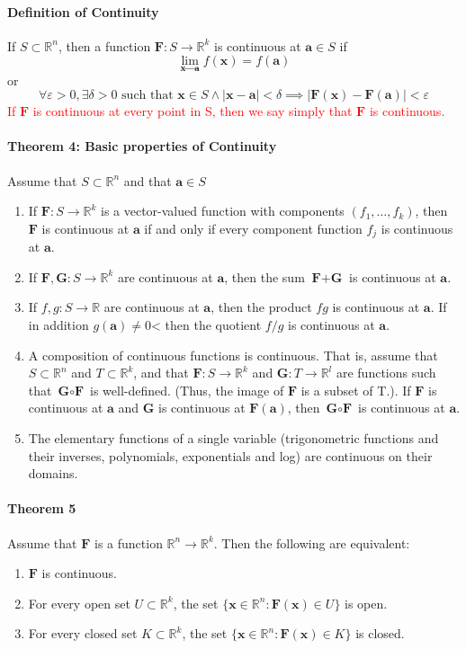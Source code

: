 \documentclass[11pt]{article}
\newcommand{\tb}[1]{\textbf{#1}}
\newcommand{\real}[0]{\mathbb{R}}
\newcommand{\vx}[0]{\tb{x}}
\newcommand{\va}[0]{\tb{a}}
\newcommand{\vf}[0]{\tb{F}}
\newcommand{\vg}[0]{\tb{G}}
\newcommand{\lima}{\underset{\vx \rightarrow \va}{\lim}}
\begin{document}
\paragraph{Definition of Continuity}
If $S \subset \real^n$, then a function $\vf: S \rightarrow \real^k$ is continuous at $\va \in S$ if 
$$ \lima f(\vx) = f(\va)$$ or
$$\forall \varepsilon > 0, \exists \delta > 0 \mbox{ such that } \vx \in S \wedge |\vx - \va| < \delta \implies |\vf(\vx) - \vf(\va)| < \varepsilon$$
\textcolor{red}{If $\vf$ is continuous at every point in S, then we say simply that $\vf$ is continuous.}
\paragraph{Theorem 4: Basic properties of Continuity} Assume that $S \subset \real^n$ and that $\va \in S$
\begin{enumerate}
	\item If $\vf: S \rightarrow \real^k$ is a vector-valued function with components $(f_1, \hdots, f_k)$, then $\vf$ is continuous at $\va$ if and only if every component function $f_j$ is continuous at $\va$.
	\item If $\vf, \vg: S \rightarrow \real^k$ are continuous at $\va$, then the sum $\vf + \vg$ is continuous at $\va$.
	\item If $f, g: S \rightarrow \real$ are continuous at $\va$, then the product $fg$ is continuous at $\va$. If in addition $g(\va) \neq 0$< then the quotient $f/g$ is continuous at $\va$.
	\item A composition of continuous functions is continuous. That is, assume that $S \subset \real^n$ and $T \subset \real^k$, and that $\vf: S \rightarrow \real^k$ and $\vg: T \rightarrow \real^l$ are functions such that $\vg \circ \vf $ is well-defined. (Thus, the image of $\vf$ is a subset of T.). If $\vf$ is continuous at $\va$ and $\vg$ is continuous at $\vf(\va)$, then $\vg \circ \vf$ is continuous at $\va$.
	\item The elementary functions of a single variable (trigonometric functions and their inverses, polynomials, exponentials and log) are continuous on their domains.
\end{enumerate}
\paragraph{Theorem 5} Assume that $\vf$ is a function $\real^n \rightarrow \real^k$. Then the following are equivalent:
\begin{enumerate}
	\item $\vf$ is continuous.
	\item For every open set $U \subset \real^k$, the set $\{ \vx \in \real^n: \vf(\vx) \in U\}$ is open.
	\item For every closed set $K \subset \real^k$, the set $\{ \vx \in \real^n: \vf(\vx) \in K \}$ is closed.
\end{enumerate}
\end{document}
